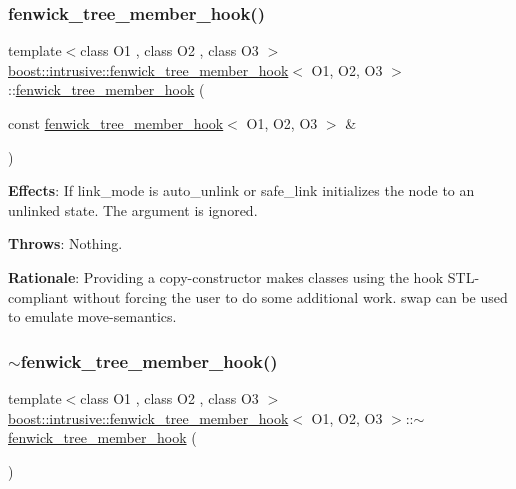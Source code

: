 \subsubsection{\texorpdfstring{fenwick\+\_\+tree\+\_\+member\+\_\+hook()}{fenwick\_tree\_member\_hook()}\hspace{0.1cm}{\footnotesize\ttfamily [2/2]}}
{\footnotesize\ttfamily template$<$class O1 , class O2 , class O3 $>$ \\
\hyperlink{classboost_1_1intrusive_1_1fenwick__tree__member__hook}{boost\+::intrusive\+::fenwick\+\_\+tree\+\_\+member\+\_\+hook}$<$ O1, O2, O3 $>$\+::\hyperlink{classboost_1_1intrusive_1_1fenwick__tree__member__hook}{fenwick\+\_\+tree\+\_\+member\+\_\+hook} (\begin{DoxyParamCaption}\item[{const \hyperlink{classboost_1_1intrusive_1_1fenwick__tree__member__hook}{fenwick\+\_\+tree\+\_\+member\+\_\+hook}$<$ O1, O2, O3 $>$ \&}]{ }\end{DoxyParamCaption})}

{\bfseries Effects}\+: If link\+\_\+mode is {\ttfamily auto\+\_\+unlink} or {\ttfamily safe\+\_\+link} initializes the node to an unlinked state. The argument is ignored.

{\bfseries Throws}\+: Nothing.

{\bfseries Rationale}\+: Providing a copy-\/constructor makes classes using the hook S\+T\+L-\/compliant without forcing the user to do some additional work. {\ttfamily swap} can be used to emulate move-\/semantics. \mbox{\label{classboost_1_1intrusive_1_1fenwick__tree__member__hook_a372590a3dab9a2ab85267409010d972a}} 
\subsubsection{\texorpdfstring{$\sim$fenwick\+\_\+tree\+\_\+member\+\_\+hook()}{~fenwick\_tree\_member\_hook()}}
{\footnotesize\ttfamily template$<$class O1 , class O2 , class O3 $>$ \\
\hyperlink{classboost_1_1intrusive_1_1fenwick__tree__member__hook}{boost\+::intrusive\+::fenwick\+\_\+tree\+\_\+member\+\_\+hook}$<$ O1, O2, O3 $>$\+::$\sim$\hyperlink{classboost_1_1intrusive_1_1fenwick__tree__member__hook}{fenwick\+\_\+tree\+\_\+member\+\_\+hook} (\begin{DoxyParamCaption}{ }\end{DoxyParamCaption})}

